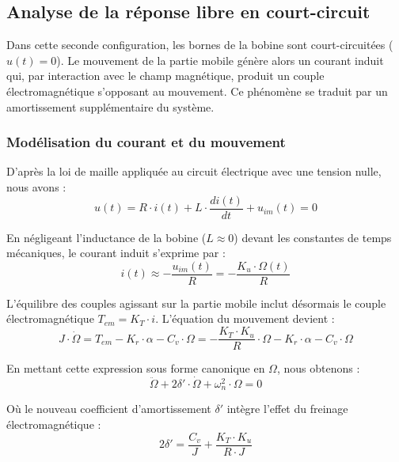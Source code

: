 \newpage


\subsection{Analyse de la réponse libre en court-circuit}

Dans cette seconde configuration, les bornes de la bobine sont court-circuitées ($u(t) = 0$). Le mouvement de la partie mobile génère alors un courant induit qui, par interaction avec le champ magnétique, produit un couple électromagnétique s'opposant au mouvement. Ce phénomène se traduit par un amortissement supplémentaire du système.

\subsubsection{Modélisation du courant et du mouvement}

D'après la loi de maille appliquée au circuit électrique avec une tension nulle, nous avons :
\begin{equation}
u(t) = R \cdot i(t) + L \cdot \frac{di(t)}{dt} + u_{im}(t) = 0
\end{equation}

En négligeant l'inductance de la bobine ($L \approx 0$) devant les constantes de temps mécaniques, le courant induit s'exprime par :
\begin{equation}
i(t) \approx -\frac{u_{im}(t)}{R} = -\frac{K_u \cdot \Omega(t)}{R}
\end{equation}

L'équilibre des couples agissant sur la partie mobile inclut désormais le couple électromagnétique $T_{em} = K_T \cdot i$. L'équation du mouvement devient :
\begin{equation}
J \cdot \dot{\Omega} = T_{em} - K_r \cdot \alpha - C_v \cdot \Omega = -\frac{K_T \cdot K_u}{R} \cdot \Omega - K_r \cdot \alpha - C_v \cdot \Omega
\end{equation}

En mettant cette expression sous forme canonique en $\Omega$, nous obtenons :
\begin{equation}
\ddot{\Omega} + 2\delta' \cdot \dot{\Omega} + \omega_n^2 \cdot \Omega = 0
\end{equation}

Où le nouveau coefficient d'amortissement $\delta'$ intègre l'effet du freinage électromagnétique :
\begin{equation}
2\delta' = \frac{C_v}{J} + \frac{K_T \cdot K_u}{R \cdot J}
\end{equation}

